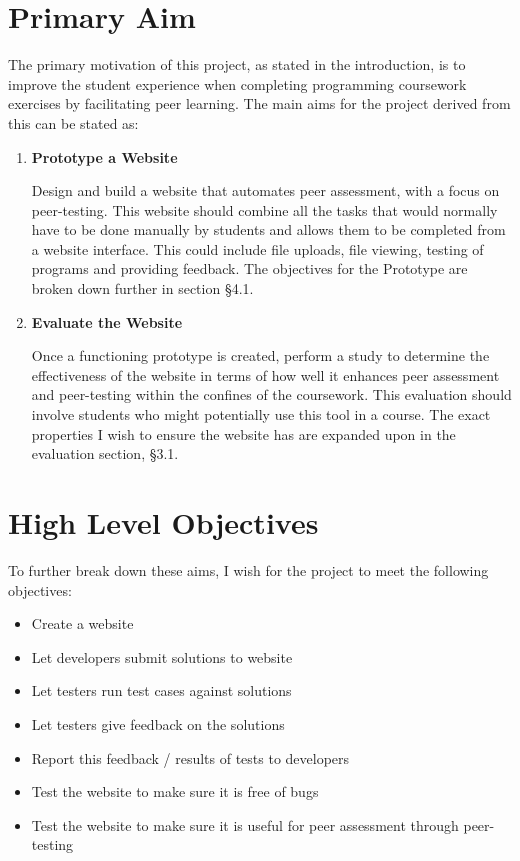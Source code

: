 \documentclass[a4paper,11pt]{report}
\begin{document}
\section{Primary Aim}
The primary motivation of this project, as stated in the introduction, is to improve the student experience when completing programming coursework exercises by facilitating peer learning. The main aims for the project derived from this can be stated as:
\begin{enumerate}
\item \textbf{Prototype a Website}\par
Design and build a website that automates peer assessment, with a focus on peer-testing. This website should combine all the tasks that would normally have to be done manually by students and allows them to be completed from a website interface. This could include file uploads, file viewing, testing of programs and providing feedback. The objectives for the Prototype are broken down further in section \S4.1.
\item \textbf{Evaluate the Website}\par
Once a functioning prototype is created, perform a study to determine the effectiveness of the website in terms of how well it enhances peer assessment and peer-testing within the confines of the coursework. This evaluation should involve students who might potentially use this tool in a course. The exact properties I wish to ensure the website has are expanded upon in the evaluation section, \S3.1.
\end{enumerate}

\section{High Level Objectives}
To further break down these aims, I wish for the project to meet the following objectives:
\begin{itemize}
\item Create a website
\item Let developers submit solutions to website
\item Let testers run test cases against solutions
\item Let testers give feedback on the solutions
\item Report this feedback / results of tests to developers
\item Test the website to make sure it is free of bugs
\item Test the website to make sure it is useful for peer assessment through peer-testing
\end{itemize}
\end{document}

